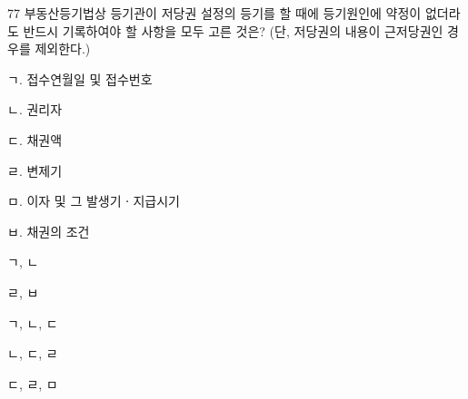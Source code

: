 \begin{question}{77}
부동산등기법상 등기관이 저당권 설정의 등기를 할 때에 등기원인에 약정이 없더라도 반드시 기록하여야 할 사항을 모두 고른 것은? (단, 저당권의 내용이 근저당권인 경우를 제외한다.)
\begin{framedtext}
ㄱ. 접수연월일 및 접수번호 \par
ㄴ. 권리자 \par
ㄷ. 채권액 \par
ㄹ. 변제기 \par
ㅁ. 이자 및 그 발생기ㆍ지급시기 \par
ㅂ. 채권의 조건
\end{framedtext}
\begin{choices}
  \item ㄱ, ㄴ
  \item ㄹ, ㅂ
  \item ㄱ, ㄴ, ㄷ
  \item ㄴ, ㄷ, ㄹ
  \item ㄷ, ㄹ, ㅁ
\end{choices}
\end{question}
